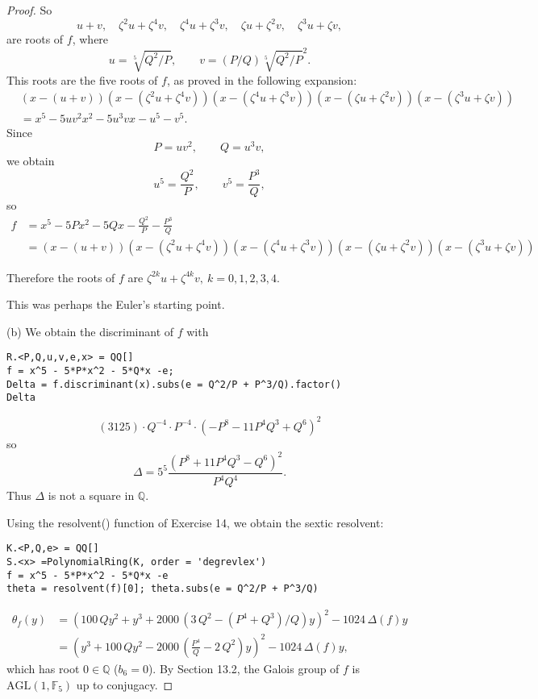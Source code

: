 \documentclass[11pt,a4paper]{article}
\newcommand{\Q}{\mathbb{Q}}
\newcommand{\F}{\mathbb{F}}
\begin{document}
\begin{proof}
So $$u+v,\quad \zeta^2 u + \zeta^4 v, \quad\zeta^4 u + \zeta^3 v,\quad \zeta u + \zeta^2 v,\quad \zeta^3 u + \zeta v,$$
are roots of $f$, where 
$$u = \sqrt[5]{Q^2/P} ,\qquad  v = (P/Q)\sqrt[5]{Q^2/P}^2 .$$ 
This roots are the five roots of $f$, as proved in the following expansion:
\begin{align*}
& (x - (u+v))(x- (\zeta^2 u + \zeta^4 v))(x- (\zeta^4 u + \zeta^3 v))(x-(\zeta u + \zeta^2 v))(x- (\zeta^3 u + \zeta v))\\
& = x^5 -5 uv^2 x^2 -5 u^3v x -u^5-v^5.
\end{align*}
Since 
$$P = uv^2, \qquad Q = u^3 v,$$
we obtain 
$$u^5 = \frac{Q^2}{P},\qquad v^5 = \frac{P^3}{Q},$$
so
\begin{align*}
f &= x^5 - 5Px^2 - 5Qx - \frac{Q^{2}}{P} -\frac{P^{3}}{Q}\\
&=(x - (u+v))(x- (\zeta^2 u + \zeta^4 v))(x- (\zeta^4 u + \zeta^3 v))(x-(\zeta u + \zeta^2 v))(x- (\zeta^3 u + \zeta v))
\end{align*}

Therefore the roots of $f$ are $\zeta^{2k} u + \zeta^{4k} v,\ k=0,1,2,3,4$.

This was perhaps the Euler's starting point.

\item[(b)] We obtain the discriminant of $f$ with
\begin{verbatim}
R.<P,Q,u,v,e,x> = QQ[]
f = x^5 - 5*P*x^2 - 5*Q*x -e;
Delta = f.discriminant(x).subs(e = Q^2/P + P^3/Q).factor()
Delta
\end{verbatim}
$$\left(3125\right) \cdot Q^{-4} \cdot P^{-4} \cdot (- P^{8} - 11 P^{4}
Q^{3} + Q^{6})^{2}
$$
so
$$\Delta = 5^5 \frac{(P^8 +11 P^4 Q^3 -Q^6)^2}{P^4Q^4}.$$
Thus $\Delta$ is not a square in $\Q$.

Using the resolvent() function of Exercise 14, we obtain the sextic resolvent:
\begin{verbatim}
K.<P,Q,e> = QQ[]
S.<x> =PolynomialRing(K, order = 'degrevlex')
f = x^5 - 5*P*x^2 - 5*Q*x -e
theta = resolvent(f)[0]; theta.subs(e = Q^2/P + P^3/Q)
\end{verbatim}
\begin{align*}
\theta_f(y) &=  {   \left( 100 \, Q y^{2} + y^{3} + 2000 \, {\left( 3 \,Q^{2}-\left(P^4+Q^3\right)/Q \right)} y\right)}^{2} - 1024 \, \Delta(f) y\\
&=  {   \left( y^{3} +100 \, Q y^{2}  - 2000 \, {\left(\frac{P^{4}}{Q} - 2 \,Q^{2}\right)} y\right)}^{2} - 1024 \, \Delta(f) y,
\end{align*}
which has root $0 \in \Q$ ($b_6 = 0$).
By Section 13.2, the Galois group of $f$ is $\mathrm{AGL}(1,\F_5)$ up to conjugacy.


\end{proof}
\end{document}
